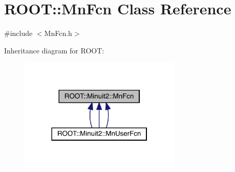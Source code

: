 \hypertarget{classROOT_1_1Minuit2_1_1MnFcn}{}\section{R\+O\+OT\+:\+:Mn\+Fcn Class Reference}
\label{classROOT_1_1Minuit2_1_1MnFcn}


{\ttfamily \#include $<$Mn\+Fcn.\+h$>$}



Inheritance diagram for R\+O\+OT\+:
\nopagebreak
\begin{figure}[H]
\begin{center}
\leavevmode
\includegraphics[width=219pt]{d9/d63/classROOT_1_1Minuit2_1_1MnFcn__inherit__graph}
\end{center}
\end{figure}
